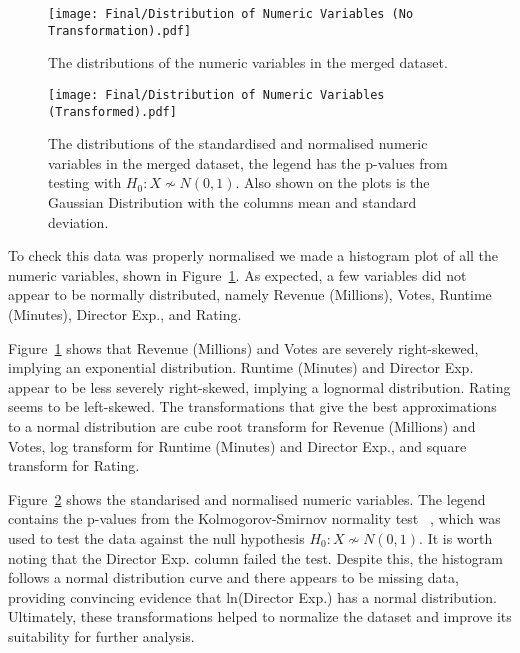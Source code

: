    \begin{multicols}{2}
        \begin{figure}[H]
            \centering
            \texttt{[image: Final/Distribution of Numeric Variables (No Transformation).pdf]}
            \caption{The distributions of the numeric variables in the merged dataset.}\label{fig-distribution-of-numeric-variable}
        \end{figure}

        \begin{figure}[H]
            \centering
            \texttt{[image: Final/Distribution of Numeric Variables (Transformed).pdf]}
            \caption{The distributions of the standardised and normalised numeric variables
                in the merged dataset, the legend has the p-values from testing with
                $H_{0}: X \not\sim N(0,1)$.
                Also shown on the plots is the Gaussian Distribution with the columns mean and
                    standard deviation.
            }\label{fig-transformed-distribution-of-numeric-variable}
        \end{figure}

        To check this data was properly normalised we made a histogram plot of all the
            numeric variables, shown in Figure~\ref{fig-distribution-of-numeric-variable}.
        As expected, a few variables did not appear to be normally distributed, namely
            Revenue (Millions), Votes, Runtime (Minutes), Director Exp., and Rating.

        Figure~\ref{fig-distribution-of-numeric-variable} shows that Revenue (Millions)
            and Votes are severely right-skewed, implying an exponential distribution.
        Runtime (Minutes) and Director Exp.
        appear to be less severely right-skewed,
        implying a lognormal distribution.
        Rating seems to be left-skewed.
        The transformations that give the best approximations to a normal distribution
            are cube root transform for Revenue (Millions) and Votes, log transform for
            Runtime (Minutes) and Director Exp., and square transform for Rating.

        Figure~\ref{fig-transformed-distribution-of-numeric-variable} shows the
            standarised and normalised numeric variables.
        The legend contains the p-values from the Kolmogorov-Smirnov normality test
            ~\cite{KStest}, which was used to test the data against the null hypothesis
            $H_{0}: X \not\sim N(0,1)$.
        It is worth noting that the Director Exp.
        column failed the test.
        Despite this, the histogram follows a normal distribution curve and there
            appears to be missing data, providing convincing evidence that ln(Director
            Exp.)
        has a normal distribution.
        Ultimately, these transformations helped to normalize the dataset and improve
            its suitability for further analysis.


\end{multicols}
